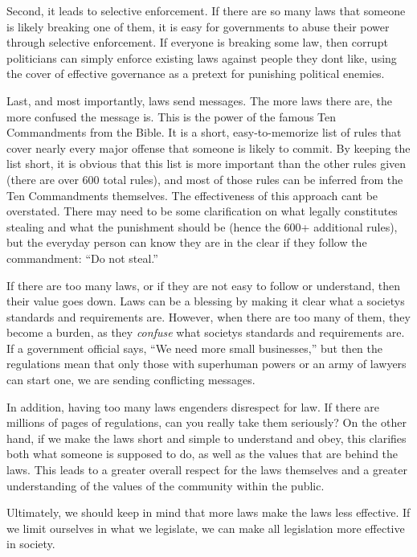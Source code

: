 Second, it leads to selective enforcement. If there are so many laws
that someone is likely breaking one of them, it is easy for governments
to abuse their power through selective enforcement. If everyone is
breaking some law, then corrupt politicians can simply enforce existing
laws against people they don{\textquotesingle}t like,
using the cover of
effective governance as a pretext for punishing political enemies.

Last, and most importantly, laws send messages. The more laws there are,
the more confused the message is. This is the power of the famous Ten
Commandments from the Bible. It is a short, easy-to-memorize list of
rules that cover nearly every major offense that someone is likely to
commit. By keeping the list short, it is obvious that this list is more
important than the other rules given (there are over 600 total rules),
and most of those rules can be inferred from the Ten Commandments
themselves. The effectiveness of this approach can{\textquotesingle}t
be overstated. There may need to be some clarification on what legally
constitutes stealing and what the punishment should be (hence the 600+
additional rules), but the everyday person can know they are in the
clear if they follow the commandment: “Do not steal.”  

If there are too many laws, or if they are not easy to follow or
understand, then their value goes down. Laws can be a blessing by
making it clear what a society{\textquotesingle}s standards and
requirements are. However, when there are too many of them, they become
a burden, as they \textit{confuse} what society{\textquotesingle}s
standards and requirements are. If a government official says, “We need
more small businesses,” but then the regulations mean that only those
with superhuman powers or an army of lawyers can start one, we are
sending conflicting messages.

In addition, having too many laws engenders disrespect for law. If there
are millions of pages of regulations, can you really take them
seriously?  On the
other hand, if we make the laws short and simple to understand and
obey, this clarifies both what someone is supposed to do, as well as
the values that are behind
the laws. This leads
to a greater overall respect for the laws themselves and a greater
understanding of the values of the community within the public.

Ultimately, we should
keep in mind that more laws make the laws less effective.  If we limit
ourselves in what we legislate, we can make all legislation more
effective in society. 

